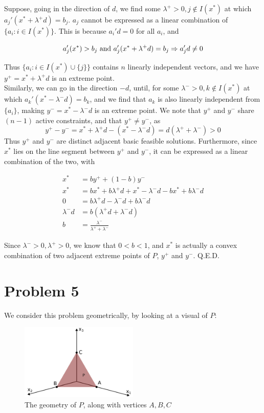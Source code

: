 \documentclass[11pt]{article}
\begin{document}
Suppose, going in the direction of $d$, we find some $\lambda^+>0, j\notin I(x^*)$ at which $a_j'(x^*+\lambda^+d)=b_j$. $a_j$ cannot be expressed as a linear combination of $\{a_i: i\in I(x^*)\}$. This is because $a_i'd=0$ for all $a_i$, and

$$
a_j'(x^*)>b_j \text{ and } a_j'(x^* + \lambda^+ d) = b_j \Rightarrow a_j'd \neq 0\\
$$

Thus $\{a_i: i\in I(x^*)\cup\{j\}\}$ contains $n$ linearly independent vectors, and we have $y^+=x^*+\lambda^+ d$ is an extreme point.\\

Similarly, we can go in the direction $-d$, until, for some $\lambda^-> 0, k\notin I(x^*)$ at which $a_k'(x^*-\lambda^-d)=b_k$, and we find that $a_k$ is also linearly independent from $\{a_i\}$, making  $y^-=x^*-\lambda^- d$ is an extreme point. We note that $y^+$ and $y^-$ share $(n-1)$ active constraints, and that $y^+\neq y^-$, as
$$
y^+-y^-=x^*+\lambda^+ d - (x^*-\lambda^- d) = d(\lambda^++\lambda^-)>0
$$
Thus $y^+$ and $y^-$ are distinct adjacent basic feasible solutions. Furthermore, since $x^*$ lies on the line segment between $y^+$ and $y^-$, it can be expressed as a linear combination of the two, with

\begin{equation}
\begin{split}
x^* &= by^+ + (1-b)y^-\\
x^* &= bx^* + b\lambda^+d + x^* - \lambda^-d - bx^* + b\lambda^-d\\
0 &= b\lambda^+d - \lambda^-d + b\lambda^-d\\
\lambda^-d &= b(\lambda^+d+\lambda^-d)\\
b&=\frac{\lambda^-}{\lambda^+ + \lambda^-}
\end{split}
\end{equation}

Since $\lambda^->0, \lambda^+>0$, we know that $0<b<1$, and $x^*$ is actually a convex combination of two adjacent extreme points of $P$, $y^+$ and $y^-$. Q.E.D.

\section*{Problem 5}

We consider this problem geometrically, by looking at a visual of $P$:

\begin{figure}[h]
\includegraphics[width=0.5\textwidth]{5_geometry}
\centering
\caption{The geometry of $P$, along with vertices $A, B, C$}
\end{figure}
\end{document}
